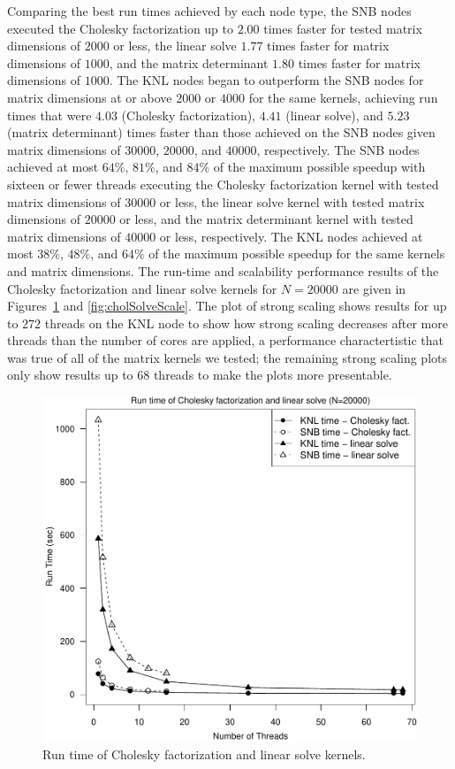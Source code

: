 Comparing the best run times achieved by each node type, the SNB nodes
  executed the Cholesky factorization up to $2.00$ times faster for tested
  matrix dimensions of $2000$ or less, the linear solve $1.77$ times
  faster for matrix dimensions of $1000$, and the matrix determinant $1.80$
  times faster for matrix dimensions of $1000$.
The KNL nodes began to outperform the SNB nodes for matrix
  dimensions at or above $2000$ or $4000$ for the same kernels, achieving run
  times that were $4.03$ (Cholesky factorization), $4.41$ (linear solve),
  and $5.23$ (matrix determinant) times faster than those achieved on the SNB
  nodes given matrix dimensions of $30000$, $20000$, and $40000$, respectively.
The SNB nodes achieved at most $64\%$, $81\%$, and $84\%$ of the
  maximum possible speedup with sixteen or fewer threads executing the Cholesky
  factorization kernel with tested matrix dimensions of $30000$ or less, the
  linear solve kernel with tested matrix dimensions of $20000$ or less,
  and the matrix determinant kernel with tested matrix dimensions of $40000$ or
  less, respectively.
The KNL nodes achieved at most $38\%$, $48\%$, and $64\%$ of the
  maximum possible speedup for the same kernels and matrix dimensions.
The run-time and scalability performance results of the Cholesky factorization
  and linear solve kernels for $N=20000$ are given in Figures~\ref{fig:cholSolveTime}
  and \ref{fig:cholSolveScale}.
The plot of strong scaling shows results for up to $272$ threads on the KNL
  node to show how strong scaling decreases after more threads than the number of cores
  are applied, a performance charactertistic that was true of all of the matrix
  kernels we tested; the remaining strong scaling plots only show results up to
  $68$ threads to make the plots more presentable.
\begin{figure}
\includegraphics[height=\columnwidth, width=\columnwidth]{chol_solve_20000_68-rt.pdf}
\caption{Run time of Cholesky factorization and linear solve kernels.}
\label{fig:cholSolveTime}
\end{figure}
